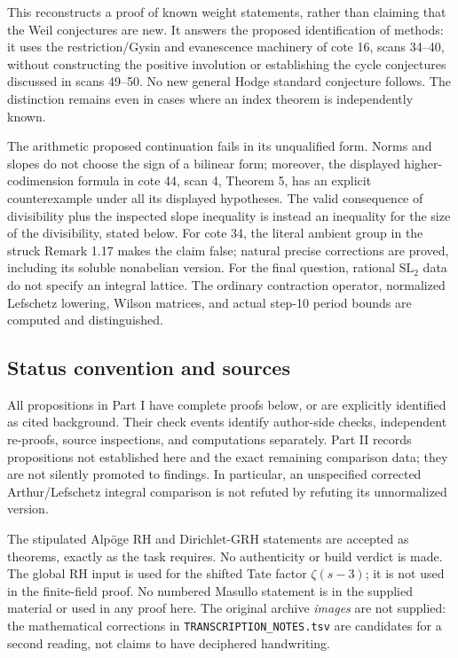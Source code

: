 \documentclass[11pt,a4paper]{article}
\theoremstyle{remark}
\begin{document}
This reconstructs a proof of known weight statements, rather than claiming
that the Weil conjectures are new.  It answers the proposed identification
of methods: it uses the restriction/Gysin and evanescence machinery of
cote 16, scans 34--40, without constructing the positive involution or
establishing the cycle conjectures discussed in scans 49--50.  No new general
Hodge standard conjecture follows.  The distinction remains even in cases
where an index theorem is independently known.

The arithmetic proposed continuation fails in its unqualified form.
Norms and slopes do not choose the sign of a bilinear form; moreover,
the displayed higher-codimension formula in cote 44, scan 4, Theorem 5,
has an explicit counterexample under all its displayed hypotheses.
The valid consequence of divisibility plus the inspected slope inequality
is instead an inequality for the size of the divisibility, stated below.
For cote 34, the literal ambient group in the struck Remark 1.17 makes the
claim false; natural precise corrections are proved, including its soluble
nonabelian version.  For the final question, rational $\mathrm{SL}_2$ data
do not specify an integral lattice.  The ordinary contraction operator,
normalized Lefschetz lowering, Wilson matrices, and actual step-10 period
bounds are computed and distinguished.

\subsection*{Status convention and sources}
All propositions in Part I have complete proofs below, or are explicitly
identified as cited background.  Their check events identify author-side
checks, independent re-proofs, source inspections, and computations separately.
Part II records propositions not established here and the exact remaining
comparison data; they are not silently promoted to findings.  In particular,
an unspecified corrected Arthur/Lefschetz integral comparison is not refuted
by refuting its unnormalized version.

The stipulated Alp\"oge RH and Dirichlet-GRH statements are accepted as
theorems, exactly as the task requires.  No authenticity or build verdict is
made.  The global RH input is used for the shifted Tate factor
$\zeta(s-3)$; it is not used in the finite-field proof.  No numbered Masullo
statement is in the supplied material or used in any proof here.
The original archive \emph{images} are not supplied: the mathematical
corrections in \texttt{TRANSCRIPTION\_NOTES.tsv} are candidates for a second
reading, not claims to have deciphered handwriting.
\end{document}
